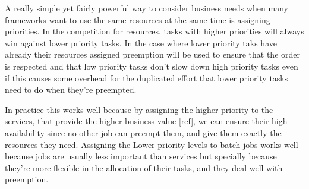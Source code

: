 \documentclass{svjour3}                     %
\begin{document}
A really simple yet fairly powerful way to consider business needs when many frameworks
want to use the same resources at the same time is assigning priorities. In the competition
for resources, tasks with higher priorities will always win against lower priority tasks. In
the case where lower priority taks have already their resources assigned preemption will be
used to ensure that the order is respected and that low priority tasks don't slow down high
priority tasks even if this causes some overhead for the duplicated effort that lower priority
tasks need to do when they're preempted.

In practice this works well because by assigning the higher priority to the services, 
that provide the higher business value [ref], we can ensure their high availability since 
no other job can preempt them, and give them exactly the resources they need. Assigning the 
Lower priority levels to batch jobs works well because jobs are usually less important
than services but specially because they're more flexible in the allocation of their tasks,
and they deal well with preemption.





\end{document}
